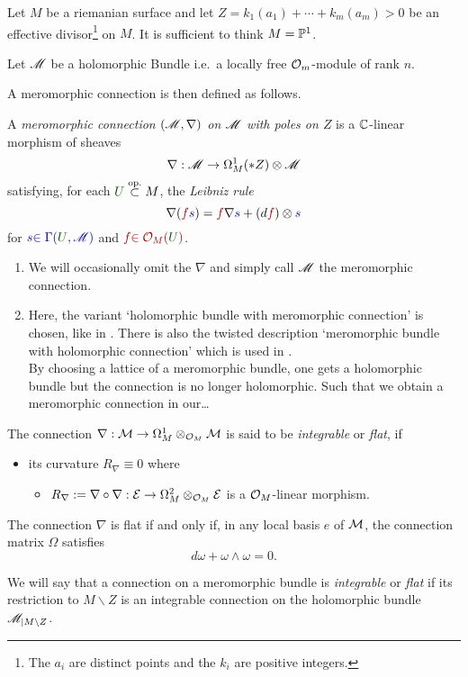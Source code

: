 Let $M$ be a riemanian surface and let $Z=k_1(a_1)+\cdots+k_m(a_m)>0$ be an
effective divisor\footnote{The $a_i$ are distinct points and the $k_i$ are
positive integers.} on $M$.
It is sufficient to think $M=\P^1$.

Let $\sM$ be a holomorphic Bundle i.e.\ a locally free $\cO_m$-module of rank
$n$.

A meromorphic connection is then defined as follows.
\begin{defn}
  \def\myU{\textcolor{green!30!black}{U}}
  \def\mys{\textcolor{blue!60!black}{s}}
  \def\myf{\textcolor{red!60!black}{f}}
  A \emph{meromorphic connection $(\sM,\nabla)$ on $\sM$ with poles on $Z$}
  is a $\C$-linear morphism of sheaves
  \[
    \nabla:\sM\to\Omega_M^1(*Z)\otimes\sM
  \]
  satisfying, for each $\myU\overset{\text{op.}}{\subset} M$, the
  \emph{Leibniz rule}
    \[
      \nabla(\myf\mys)=\myf\nabla\mys+(d\myf)\otimes\mys
    \]
  for $\mys\textcolor{blue!60!black}{\in\Gamma(\myU,\sM)}$ and
  $\myf\textcolor{red!60!black}{\in\cO_M(\myU)}$.

\end{defn}
\begin{rem}
  \begin{enumerate}
    \item We will occasionally omit the $\nabla$ and simply call $\sM$ the
      meromorphic connection.
    \item Here, the variant `holomorphic bundle with meromorphic connection' is
      chosen, like in \cite{boalch}.  There is also the twisted description
      `meromorphic bundle with holomorphic connection' which is used in
      \cite{sabbah2007isomonodromic}.
      \\ By choosing a lattice of a meromorphic bundle, one gets a holomorphic
      bundle but the connection is no longer holomorphic. Such that we obtain a
      meromorphic connection in our\dots\TODO
  \end{enumerate}
\end{rem}

\begin{defn}[Flatness (0.12.2)]
  The connection $\nabla:\cM\to \Omega_M^1\otimes_{\cO_M}\cM$ is said to be
  \emph{integrable} or \emph{flat}, if
  \begin{itemize}
    \item its curvature $R_\nabla\equiv0$
    where
    \begin{itemize}
      \item $R_\nabla:=\nabla\circ\nabla:\cE\to\Omega_M^2\otimes_{\cO_M}\cE$
        is a $\cO_M$-linear morphism.
    \end{itemize}
  \end{itemize}
  \begin{prop}[0.12.4]
    The connection $\nabla$ is flat if and only if, in any local basis $e$ of
    $\cM$, the connection matrix $\Omega$ satisfies
    \[
      d\omega + \omega \wedge \omega = 0.
    \]
  \end{prop}
  We will say that a connection on a meromorphic bundle is \emph{integrable} or
  \emph{flat} if its restriction to $M\backslash Z$ is an integrable connection
  on the holomorphic bundle $\sM_{|M\backslash Z}$.
\end{defn}

